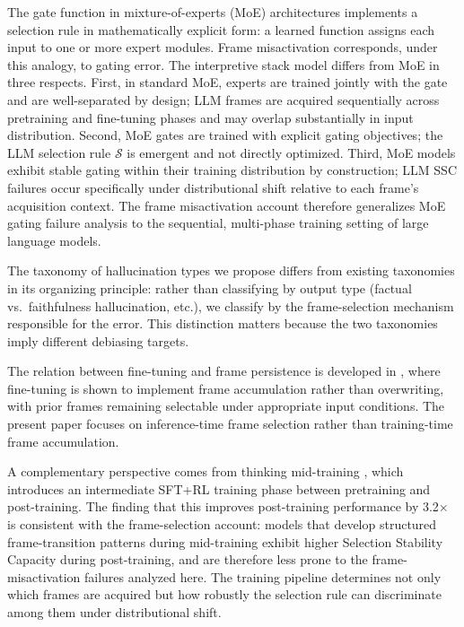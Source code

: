 \documentclass[12pt]{article}
\begin{document}
The gate function in mixture-of-experts (MoE) architectures
\cite{jacobs1991, jordan1994} implements a selection rule in
mathematically explicit form: a learned function assigns each input
to one or more expert modules. Frame misactivation corresponds,
under this analogy, to gating error. The interpretive stack model
differs from MoE in three respects. First, in standard MoE, experts
are trained jointly with the gate and are well-separated by design;
LLM frames are acquired sequentially across pretraining and fine-tuning
phases and may overlap substantially in input distribution. Second, MoE
gates are trained with explicit gating objectives; the LLM selection
rule $\mathcal{S}$ is emergent and not directly optimized.
Third, MoE models exhibit stable gating within their training
distribution by construction; LLM SSC failures occur specifically under
distributional shift relative to each frame's acquisition context.
The frame misactivation account therefore generalizes MoE gating
failure analysis to the sequential, multi-phase training setting
of large language models.

The taxonomy of hallucination types we propose differs from
existing taxonomies \cite{huang2023survey, zhang2023siren} in
its organizing principle: rather than classifying by output
type (factual vs.\ faithfulness hallucination, etc.), we
classify by the frame-selection mechanism responsible for the
error. This distinction matters because the two taxonomies
imply different debiasing targets.

The relation between fine-tuning and frame persistence is
developed in \cite{minamoto2026accumulation}, where fine-tuning is
shown to implement frame accumulation rather than overwriting,
with prior frames remaining selectable under appropriate input
conditions. The present paper focuses on inference-time frame
selection rather than training-time frame accumulation.

A complementary perspective comes from thinking mid-training
\cite{lanchantin2026midtraining}, which introduces an intermediate
SFT+RL training phase between pretraining and post-training. The
finding that this improves post-training performance by 3.2$\times$
is consistent with the frame-selection account: models that develop
structured frame-transition patterns during mid-training exhibit
higher Selection Stability Capacity during post-training, and are
therefore less prone to the frame-misactivation failures analyzed
here. The training pipeline determines not only which frames are
acquired but how robustly the selection rule can discriminate among
them under distributional shift.
\end{document}
